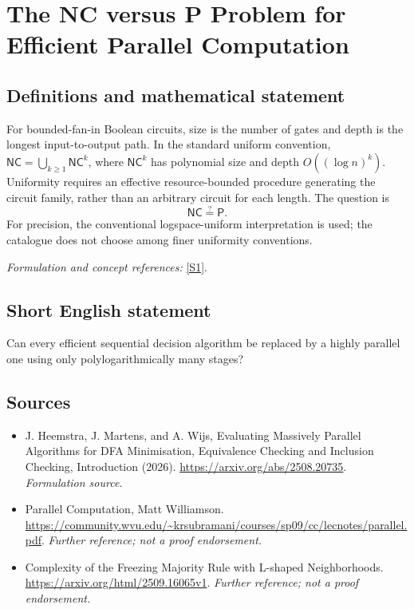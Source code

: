 \documentclass[11pt]{article}
\begin{document}
\section*{\texorpdfstring{The NC versus P Problem for Efficient Parallel Computation}{The NC versus P Problem for Efficient Parallel Computation}}\label{30006685}
\subsection{Definitions and mathematical statement}
For bounded-fan-in Boolean circuits, size is the number of gates and depth is the longest input-to-output path. In the standard uniform convention, $\mathsf{NC}=\bigcup_{k\ge1}\mathsf{NC}^k$, where $\mathsf{NC}^k$ has polynomial size and depth $O((\log n)^k)$. Uniformity requires an effective resource-bounded procedure generating the circuit family, rather than an arbitrary circuit for each length. The question is
\[
 \mathsf{NC}\stackrel{?}{=}\mathsf P.
\]
For precision, the conventional logspace-uniform interpretation is used; the catalogue does not choose among finer uniformity conventions.
\par\smallskip\textit{Formulation and concept references:} \href{https://arxiv.org/abs/2508.20735}{[S1]}.

\subsection{Short English statement}
Can every efficient sequential decision algorithm be replaced by a highly parallel one using only polylogarithmically many stages?
\subsection{Sources}
\begin{itemize}
\item[S1]J. Heemstra, J. Martens, and A. Wijs, Evaluating Massively Parallel Algorithms for DFA Minimisation, Equivalence Checking and Inclusion Checking, Introduction (2026).
\url{https://arxiv.org/abs/2508.20735}.
\textit{Formulation source.}
\item[S2]Parallel Computation, Matt Williamson.
\url{https://community.wvu.edu/~krsubramani/courses/sp09/cc/lecnotes/parallel.pdf}.
\textit{Further reference; not a proof endorsement.}
\item[S3]Complexity of the Freezing Majority Rule with L-shaped Neighborhoods.
\url{https://arxiv.org/html/2509.16065v1}.
\textit{Further reference; not a proof endorsement.}
\end{itemize}
\end{document}
